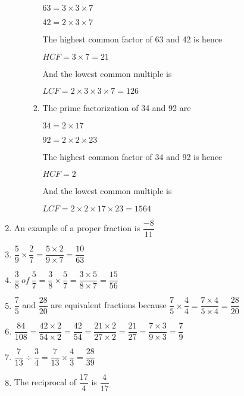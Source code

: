\documentclass[fleqn]{article}
\begin{document}
\begin{enumerate}[label=\textbf{\arabic*.},labelsep=2em]
\begin{enumerate}[label=\textbf{\arabic*.},labelsep=2em]
\begin{enumerate}[label=\textbf{(\alph*)},labelsep=2em]
$ 63 = 3 \times 3 \times 7 $

$ 42 = 2 \times 3 \times 7 $

The highest common factor of 63 and 42 is hence

$ HCF = 3 \times 7 = 21 $

And the lowest common multiple is

$ LCF = 2 \times 3 \times 3 \times 7 = 126 $
\item 
The prime factorization of 34 and 92 are

$ 34 = 2 \times 17$

$ 92 = 2 \times 2 \times 23 $

The highest common factor of 34 and 92 is hence

$ HCF = 2 $

And the lowest common multiple is

$ LCF = 2 \times 2 \times 17 \times 23 = 1564 $

\end{enumerate}

\end{enumerate} %

\setcounter{enumi}{27}
\item
An example of a proper fraction is $ \dfrac{-8}{11} $

\setcounter{enumi}{29}
\item
$ \dfrac{5}{9} \times \dfrac{2}{7} = \dfrac{5 \times 2}{ 9 \times 7} = \dfrac{10}{63}$

\setcounter{enumi}{32}
\item
$ \dfrac{3}{8}\ of\ \dfrac{5}{7} = \dfrac{3}{8} \times \dfrac{5}{7} = \dfrac{3 \times 5}{ 8 \times 7} = \dfrac{15}{56}$

\setcounter{enumi}{33}
\item
$ \dfrac{7}{5} $ and $ \dfrac{28}{20} $ are equivalent fractions because $ \dfrac{7}{5} \times \dfrac{4}{4} = \dfrac{7 \times 4}{5 \times 4} = \dfrac{28}{20} $

\setcounter{enumi}{34}
\item
$ \dfrac{84}{108} = \dfrac{42 \times 2}{54 \times 2} = \dfrac{42}{54} = \dfrac{21 \times 2}{27 \times 2} = \dfrac{21}{27} = \dfrac{7 \times 3}{ 9 \times 3} = \dfrac{7}{9} $

\setcounter{enumi}{36}
\item
$ \dfrac{7}{13} \div \dfrac{3}{4} = \dfrac{7}{13} \times \dfrac{4}{3} = \dfrac{28}{39}$

\setcounter{enumi}{37}
\item
The reciprocal of $ \dfrac{17}{4} $ is $ \dfrac{4}{17} $


\end{enumerate}
\end{document}
